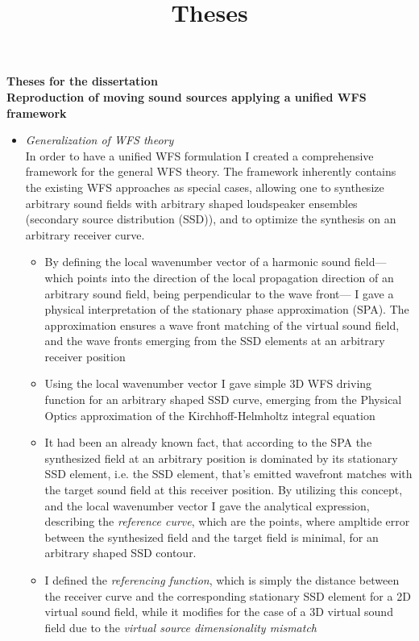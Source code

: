 \documentclass[a4paper,10pt]{article}
\title{Theses}
\date{}
\begin{document}
\begin{center}
  \textbf{\normalsize Theses for the dissertation \\
   		  \Large Reproduction of moving sound sources applying a unified WFS framework}\\[0.5cm]
\end{center}

\begin{itemize}
\item \emph{Generalization of WFS theory} \\ 
In order to have a unified WFS formulation I created a comprehensive framework for the general WFS theory. The framework inherently contains the existing WFS approaches as special cases, allowing one to synthesize arbitrary sound fields with arbitrary shaped loudspeaker ensembles (secondary source distribution (SSD)), and to optimize the synthesis on an arbitrary receiver curve. 
\begin{itemize}
\item By defining the local wavenumber vector of a harmonic sound field---which points into the direction of the local propagation direction of an arbitrary sound field, being perpendicular to the wave front--- I gave a physical interpretation of the stationary phase approximation (SPA). The approximation ensures a wave front matching of the virtual sound field, and the wave fronts emerging from the SSD elements at an arbitrary receiver position
\item Using the local wavenumber vector I gave simple 3D WFS driving function for an arbitrary shaped SSD curve, emerging from the Physical Optics approximation of the Kirchhoff-Helmholtz integral equation
\item It had been an already known fact, that according to the SPA the synthesized field at an arbitrary position is dominated by its stationary SSD element, i.e. the SSD element, that's emitted wavefront matches with the target sound field at this receiver position.
By utilizing this concept, and the local wavenumber vector I gave the analytical expression, describing the \emph{reference curve}, which are the points, where ampltide error between the synthesized field and the target field is minimal, for an arbitrary shaped SSD contour.
\item I defined the \emph{referencing function}, which is simply the distance between the receiver curve and the corresponding stationary SSD element for a 2D virtual sound field, while it modifies for the case of a 3D virtual sound field due to the \emph{virtual source dimensionality mismatch}

\end{itemize}
\end{itemize}
\end{document}
